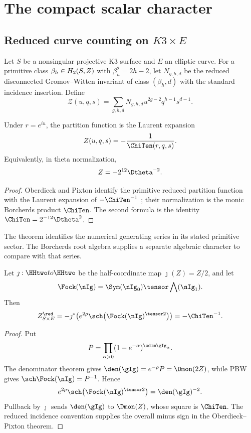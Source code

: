 \part{The compact scalar character}

\chapter{Reduced curve counting on \texorpdfstring{$K3\times E$}{K3 x E}}
Let $S$ be a nonsingular projective K3 surface and $E$ an elliptic curve. For a primitive class $\beta_h\in H_2(S,Z)$ with $\beta_h^2=2h-2$, let $N_{g,h,d}$ be the reduced disconnected Gromov--Witten invariant of class $(\beta_h,d)$ with the standard incidence insertion. Define
\[
 \mathcal Z(u,q,s)=
 \sum_{g,h,d}N_{g,h,d}u^{2g-2}q^{h-1}s^{d-1}.
\]

\begin{theorem}
Under $r=e^{iu}$, the partition function is the Laurent expansion
\[
 \mathcal Z(u,q,s)=-\frac1{\ChiTen(r,q,s)}.
\]
Equivalently, in theta normalization,
\[
 \mathcal Z=-2^{12}\Dtheta^{-2}.
\]
\end{theorem}
\begin{proof}
Oberdieck and Pixton identify the primitive reduced partition function with the Laurent expansion of $-\ChiTen^{-1}$ \cite{OP}; their normalization is the monic Borcherds product $\ChiTen$. The second formula is the identity $\ChiTen=2^{-12}\Dtheta^2$.
\end{proof}

The theorem identifies the numerical generating series in its stated
primitive sector. The Borcherds root algebra supplies a separate
algebraic character to compare with that series.

\begin{corollary}
Let $\jmath:\HHtwo\to\HHtwo$ be the half-coordinate map $\jmath(Z)=Z/2$, and let
\[
 \Fock(\nIg)=
 \Sym(\nIg_{\bar0})\tensor\bigwedge(\nIg_{\bar1}).
\]
Then
\[
 \mathcal Z^{\red}_{S\times E}
 =-\jmath^*\!\left(
 e^{2\rho}\sch\bigl(\Fock(\nIg)^{\tensor2}\bigr)
 \right)
 =-\ChiTen^{-1}.
\]
\end{corollary}
\begin{proof}
Put
\[
 P=\prod_{\alpha>0}(1-e^{-\alpha})^{\sdim\gIg_\alpha}.
\]
The denominator theorem gives $\den(\gIg)=e^{-\rho}P=\Dmon(2Z)$, while PBW gives $\sch\Fock(\nIg)=P^{-1}$.  Hence
\[
 e^{2\rho}\sch\bigl(\Fock(\nIg)^{\tensor2}\bigr)
 =\den(\gIg)^{-2}.
\]
Pullback by $\jmath$ sends $\den(\gIg)$ to $\Dmon(Z)$, whose square is $\ChiTen$.  The reduced incidence convention supplies the overall minus sign in the Oberdieck--Pixton theorem.
\end{proof}

